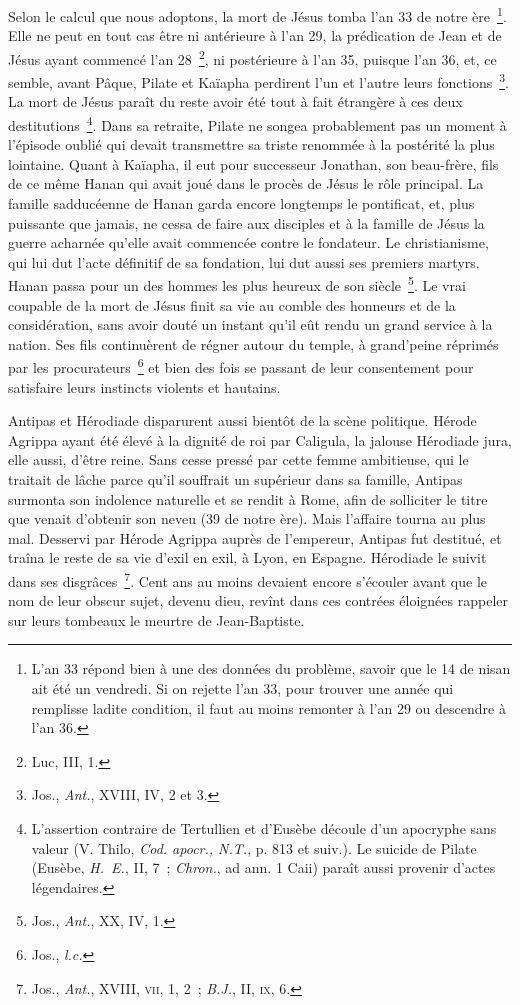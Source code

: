 \documentclass[french,twoside]{book} %
\newcommand\chaptercont{} %
\begin{document}
\chaptercont
\noindent Selon le calcul que nous adoptons, la mort de Jésus tomba l’an 33 de notre ère \footnote{L’an 33 répond bien à une des données du problème, savoir que le 14 de nisan ait été un vendredi. Si on rejette l’an 33, pour trouver une année qui remplisse ladite condition, il faut au moins remonter à l’an 29 ou descendre à l’an 36.}. Elle ne peut en tout cas être ni antérieure à l’an 29, la prédication de Jean et de Jésus ayant commencé l’an 28 \footnote{Luc, III, 1.}, ni postérieure à l’an 35, puisque l’an 36, et, ce semble, avant Pâque, Pilate et Kaïapha perdirent l’un et l’autre leurs fonctions \footnote{ Jos., {\itshape Ant.}, XVIII, IV, 2 et 3.}. La mort de Jésus paraît du reste avoir été tout à fait étrangère à ces deux destitutions \footnote{ L’assertion contraire de Tertullien et d’Eusèbe découle d’un apocryphe sans valeur (V. Thilo, {\itshape Cod. apocr., N.T.}, p. 813 et suiv.). Le suicide de Pilate (Eusèbe, {\itshape H. E.}, II, 7 ; {\itshape Chron.}, ad ann. 1 Caii) paraît aussi provenir d’actes légendaires.}. Dans sa retraite, Pilate ne songea probablement pas un moment à l’épisode oublié qui devait transmettre sa triste renommée à la postérité la plus lointaine. Quant à Kaïapha, il eut pour successeur Jonathan, son beau-frère, fils de ce même Hanan qui avait joué dans le procès de Jésus le rôle principal. La famille sadducéenne de Hanan garda encore longtemps le pontificat, et, plus puissante que jamais, ne cessa de faire aux disciples et à la famille de Jésus la guerre acharnée qu’elle avait commencée contre le fondateur. Le christianisme, qui lui dut l’acte définitif de sa fondation, lui dut aussi ses premiers martyrs. Hanan passa pour un des hommes les plus heureux de son siècle \footnote{ Jos., {\itshape Ant.}, XX, IV, 1.}. Le vrai coupable de la mort de Jésus finit sa vie au comble des honneurs et de la considération, sans avoir douté un instant qu’il eût rendu un grand service à la nation. Ses fils continuèrent de régner autour du temple, à grand’peine réprimés par les procurateurs \footnote{ Jos., {\itshape l.c.}} et bien des fois se passant de leur consentement pour satisfaire leurs instincts violents et hautains.\par
Antipas et Hérodiade disparurent aussi bientôt de la scène politique. Hérode Agrippa ayant été élevé à la dignité de roi par Caligula, la jalouse Hérodiade jura, elle aussi, d’être reine. Sans cesse pressé par cette femme ambitieuse, qui le traitait de lâche parce qu’il souffrait un supérieur dans sa famille, Antipas surmonta son indolence naturelle et se rendit à Rome, afin de solliciter le titre que venait d’obtenir son neveu (39 de notre ère). Mais l’affaire tourna au plus mal. Desservi par Hérode Agrippa auprès de l’empereur, Antipas fut destitué, et traîna le reste de sa vie d’exil en exil, à Lyon, en Espagne. Hérodiade le suivit dans ses disgrâces \footnote{ Jos., {\itshape Ant.}, XVIII, \textsc{vii}, 1, 2 ; {\itshape B.J.}, II, \textsc{ix}, 6.}. Cent ans au moins devaient encore s’écouler avant que le nom de leur obscur sujet, devenu dieu, revînt dans ces contrées éloignées rappeler sur leurs tombeaux le meurtre de Jean-Baptiste.\par
\end{document}
